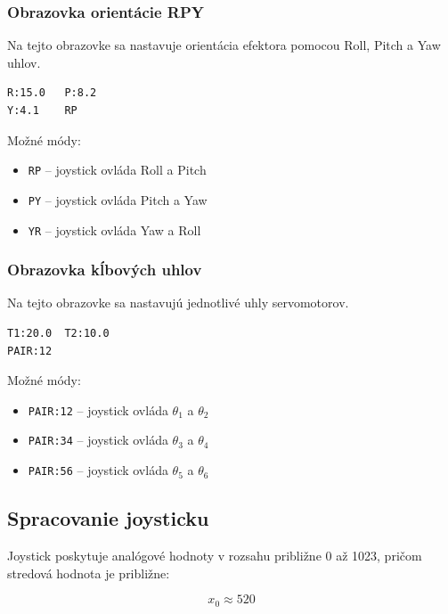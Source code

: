 \subsubsection{Obrazovka orientácie RPY}

Na tejto obrazovke sa nastavuje orientácia efektora pomocou Roll, Pitch a Yaw uhlov.

\begin{lstlisting}[caption={Ukážka obrazovky RPY}]
R:15.0   P:8.2
Y:4.1    RP
\end{lstlisting}

Možné módy:

\begin{itemize}
    \item \texttt{RP} -- joystick ovláda Roll a Pitch
    \item \texttt{PY} -- joystick ovláda Pitch a Yaw
    \item \texttt{YR} -- joystick ovláda Yaw a Roll
\end{itemize}

\subsubsection{Obrazovka kĺbových uhlov}

Na tejto obrazovke sa nastavujú jednotlivé uhly servomotorov.

\begin{lstlisting}[caption={Ukážka obrazovky JOINTS}]
T1:20.0  T2:10.0
PAIR:12
\end{lstlisting}

Možné módy:

\begin{itemize}
    \item \texttt{PAIR:12} -- joystick ovláda $\theta_1$ a $\theta_2$
    \item \texttt{PAIR:34} -- joystick ovláda $\theta_3$ a $\theta_4$
    \item \texttt{PAIR:56} -- joystick ovláda $\theta_5$ a $\theta_6$
\end{itemize}

\subsection{Spracovanie joysticku}

Joystick poskytuje analógové hodnoty v rozsahu približne 0 až 1023, pričom stredová hodnota je približne:

\begin{equation}
x_0 \approx 520
\end{equation}

